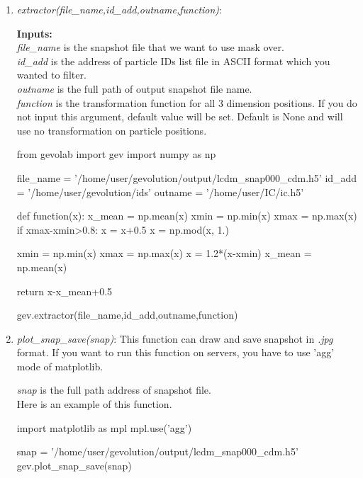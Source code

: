 \documentclass[a4paper, 12 pt]{article}
\begin{document}
\begin{enumerate}

\item \textit{extractor(file\_name,id\_add,outname,function)}: 

\textbf{Inputs:}\\
\textit{file\_name} is the snapshot file that we want to use mask over.\\
\textit{id\_add} is the address of particle IDs list file in ASCII format which you wanted to filter.\\
\textit{outname} is the full path of output snapshot file name.\\
\textit{function} is the transformation function for all 3 dimension positions. If you do not input this argument, default value will be set. Default is None and will use no transformation on particle positions.\\

\begin{python}[language=Python, caption=extractor]

from gevolab import gev
import numpy as np

file_name = '/home/user/gevolution/output/lcdm_snap000_cdm.h5'
id_add = '/home/user/gevolution/ids'
outname = '/home/user/IC/ic.h5'

def function(x):
	x_mean = np.mean(x)
	xmin = np.min(x)
	xmax = np.max(x)
	if xmax-xmin>0.8:
		x = x+0.5
	x = np.mod(x, 1.)

	xmin = np.min(x)
	xmax = np.max(x)
	x = 1.2*(x-xmin)
	x_mean = np.mean(x)

	return x-x_mean+0.5

gev.extractor(file_name,id_add,outname,function)

\end{python}

\item \textit{plot\_snap\_save(snap)}:
This function can draw and save snapshot in \textit{.jpg} format. If you want to run this function on servers, you have to use 'agg' mode of matplotlib.

\textit{snap} is the full path address of snapshot file.\\

Here is an example of this function.
\begin{python}[language=Python, caption=plot snap save]
import matplotlib as mpl
mpl.use('agg')

snap = '/home/user/gevolution/output/lcdm_snap000_cdm.h5'
gev.plot_snap_save(snap)
\end{python}


\end{enumerate}
\end{document}
